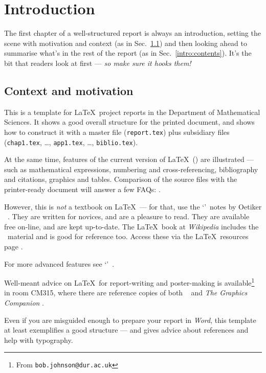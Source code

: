 \chapter{Introduction}
The first chapter of a well-structured report is always an
introduction, setting the scene with motivation and context (as in
Sec.~\ref{intro}) and then looking ahead to summarise what's in the
rest of the report (as in Sec.~\ref{intro:contents}). It's the
bit that readers look at first --- {\em so make sure it hooks them!}
%
\section{Context and motivation}\label{intro}
This is a template for \LaTeX\ project reports in the Department of
Mathematical Sciences. It shows a good overall structure for the
printed document, and shows how to construct it with a master file
(\texttt{report.tex}) plus subsidiary files (\texttt{chap1.tex},
\dots, \texttt{app1.tex}, \dots, \texttt{biblio.tex}).
\par
At the same time, features of the current version of \LaTeX\ (\LaTeXe)
are illustrated --- such as mathematical expressions, numbering and
cross-referencing, bibliography and citations, graphics and tables.
Comparison of the source files with the printer-ready document will
answer a few FAQs: .
\par
However, this is {\em not} a textbook on \LaTeX\ --- for that, use the
\lq\nss\rq\ notes by Oetiker \etal\ \cite{NSS}. They are written for
novices, and are a pleasure to read. They are available free on-line,
and are kept up-to-date. The \LaTeX\ book at \textsl{Wikipedia}
\cite{WL} includes the \nss\ material and is good for reference too.
Access these via the \LaTeX\ resources page \cite{LAT}.
\par
For more advanced features see \eg\lq\comp\rq\ \cite{MG}.
\par
Well-meant advice on \LaTeX\ for report-writing and poster-making is
available\footnote{From  \texttt{bob.johnson@dur.ac.uk}} in room CM315,
where there are reference copies of both \comp\ \cite{MG} and
\textsl{The Graphics Companion} \cite{GRM}.
\par
Even if you are misguided enough \cite{AC} to prepare your report in
\textsl{Word}, this template at least exemplifies a good structure ---
and gives advice about references and help with typography.
%
